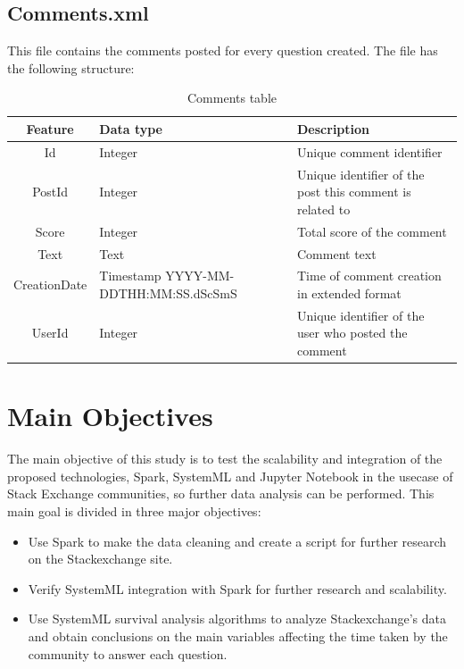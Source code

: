 \documentclass[11pt]{book} %
\begin{document}
    \subsection{Comments.xml}

      This file contains the comments posted for every question created. The file has the following structure:

      \begin{table}[!ht]
        \centering
        \begin{tabular}{|c|p{}|p{}|}
          \hline

          Feature & Data type & Description \\ \hline
          Id & Integer & Unique comment identifier \\ \hline
          PostId & Integer & Unique identifier of the post this comment is related to \\ \hline
          Score & Integer & Total score of the comment \\ \hline
          Text & Text & Comment text \\ \hline
          CreationDate & Timestamp YYYY-MM-DDTHH:MM:SS.dScSmS & Time of comment creation in extended format \\ \hline
          UserId & Integer & Unique identifier of the user who posted the comment \\

          \hline
        \end{tabular}
        \caption{Comments table}
        \label{tab:comments}
      \end{table}

\newpage

  \section{Main Objectives}

    The main objective of this study is to test the scalability and integration of the proposed technologies, Spark, SystemML and Jupyter Notebook in the usecase of Stack Exchange communities, so further data analysis can be performed. This main goal is divided in three major objectives:

    \begin{itemize}

      \item Use Spark to make the data cleaning and create a script for further research on the Stackexchange site.

      \item Verify SystemML integration with Spark for further research and scalability.

      \item Use SystemML survival analysis algorithms to analyze Stackexchange's data and obtain conclusions on the main variables affecting the time taken by the community to answer each question.

    \end{itemize}
\end{document}
